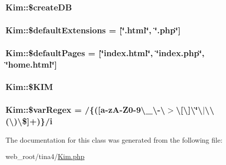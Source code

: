 \subsubsection[{\$create\+D\+B}]{\setlength{\rightskip}{0pt plus 5cm}Kim\+::\$create\+D\+B}\label{classKim_a68fb575a2ef7faf6b3b679280331033d}
\hypertarget{classKim_aecfd2bbe4c11ceb39810c393cd357b53}{}
\subsubsection[{\$default\+Extensions}]{\setlength{\rightskip}{0pt plus 5cm}Kim\+::\$default\+Extensions = \mbox{[}\char`\"{}.html\char`\"{}, \char`\"{}.php\char`\"{}\mbox{]}}\label{classKim_aecfd2bbe4c11ceb39810c393cd357b53}
\hypertarget{classKim_a761d5be4968e338c3d7ffa9f65ae3a40}{}
\subsubsection[{\$default\+Pages}]{\setlength{\rightskip}{0pt plus 5cm}Kim\+::\$default\+Pages = \mbox{[}\char`\"{}index.\+html\char`\"{}, \char`\"{}index.\+php\char`\"{}, \char`\"{}{\bf home.\+html}\char`\"{}\mbox{]}}\label{classKim_a761d5be4968e338c3d7ffa9f65ae3a40}
\hypertarget{classKim_a46554f1a34a5f3db1014d47b6ec37f00}{}
\subsubsection[{\$\+K\+I\+M}]{\setlength{\rightskip}{0pt plus 5cm}Kim\+::\$\+K\+I\+M}\label{classKim_a46554f1a34a5f3db1014d47b6ec37f00}
\hypertarget{classKim_ad641610f1c10b814588ea3ef78f04eb3}{}
\subsubsection[{\$var\+Regex}]{\setlength{\rightskip}{0pt plus 5cm}Kim\+::\$var\+Regex = \textquotesingle{}/\{(\mbox{[}{\bf a}-\/z\+A-\/Z0-\/9\textbackslash{}\+\_\+\textbackslash{}-\/\textbackslash{}$>$\textbackslash{}\mbox{[}\textbackslash{}\mbox{]}\textbackslash{}\char`\"{}\textbackslash{}$\vert$\textbackslash{}\textquotesingle{}\textbackslash{}(\textbackslash{})\textbackslash{}\$\mbox{]}+)\}/i\textquotesingle{}}\label{classKim_ad641610f1c10b814588ea3ef78f04eb3}


The documentation for this class was generated from the following file\+:\begin{DoxyCompactItemize}
\item 
web\+\_\+root/tina4/\hyperlink{Kim_8php}{Kim.\+php}\end{DoxyCompactItemize}
